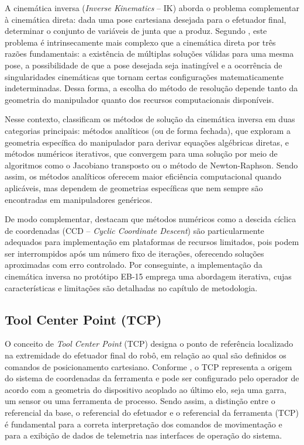 A cinemática inversa (\textit{Inverse Kinematics} -- IK) aborda o problema complementar à cinemática direta: dada uma pose cartesiana desejada para o efetuador final, determinar o conjunto de variáveis de junta que a produz. Segundo , este problema é intrinsecamente mais complexo que a cinemática direta por três razões fundamentais: a existência de múltiplas soluções válidas para uma mesma pose, a possibilidade de que a pose desejada seja inatingível e a ocorrência de singularidades cinemáticas que tornam certas configurações matematicamente indeterminadas. Dessa forma, a escolha do método de resolução depende tanto da geometria do manipulador quanto dos recursos computacionais disponíveis.

Nesse contexto,  classificam os métodos de solução da cinemática inversa em duas categorias principais: métodos analíticos (ou de forma fechada), que exploram a geometria específica do manipulador para derivar equações algébricas diretas, e métodos numéricos iterativos, que convergem para uma solução por meio de algoritmos como o Jacobiano transposto ou o método de Newton-Raphson. Sendo assim, os métodos analíticos oferecem maior eficiência computacional quando aplicáveis, mas dependem de geometrias específicas que nem sempre são encontradas em manipuladores genéricos.

De modo complementar,  destacam que métodos numéricos como a descida cíclica de coordenadas (CCD -- \textit{Cyclic Coordinate Descent}) são particularmente adequados para implementação em plataformas de recursos limitados, pois podem ser interrompidos após um número fixo de iterações, oferecendo soluções aproximadas com erro controlado. Por conseguinte, a implementação da cinemática inversa no protótipo EB-15 emprega uma abordagem iterativa, cujas características e limitações são detalhadas no capítulo de metodologia.

\subsection{Tool Center Point (TCP)}

O conceito de \textit{Tool Center Point} (TCP) designa o ponto de referência localizado na extremidade do efetuador final do robô, em relação ao qual são definidos os comandos de posicionamento cartesiano. Conforme , o TCP representa a origem do sistema de coordenadas da ferramenta e pode ser configurado pelo operador de acordo com a geometria do dispositivo acoplado ao último elo, seja uma garra, um sensor ou uma ferramenta de processo. Sendo assim, a distinção entre o referencial da base, o referencial do efetuador e o referencial da ferramenta (TCP) é fundamental para a correta interpretação dos comandos de movimentação e para a exibição de dados de telemetria nas interfaces de operação do sistema.

